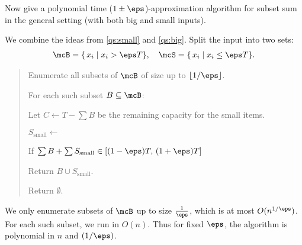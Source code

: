 \documentclass{article}
\begin{document}
\begin{subexercise}
  Now give a polynomial time (\( 1\pm \eps \))-approximation algorithm for subset sum in the general setting (with both big and small inputs).
\end{subexercise}

\begin{solution}
  We combine the ideas from \ref{qs:small} and \ref{qs:big}.
  Split the input into two sets:
  \begin{align*}
    \mcB = \{\,x_i \mid x_i > \eps T\}, \quad \mcS = \{\,x_i \mid x_i \le \eps T\}.
  \end{align*}

  \begin{quote}

  \begin{steps}
    \item Enumerate all subsets of \( \mcB \) of size up to \( \lfloor 1/\eps \rfloor \).
    \item For each such subset \( B \subseteq \mcB \):
    \begin{steps}
      \item Let \( C \leftarrow T - \sum B \) be the remaining capacity for the small items.
      \item \( S_{\text{small}} \leftarrow \) 
      \item If \( \sum B + \sum S_{\text{small}} \in [(1-\eps)T,\,(1+\eps)T] \) \begin{steps}
        \item Return \( B \cup S_{\text{small}} \).
      \end{steps}
    \end{steps}
    \item Return \( \emptyset \).
  \end{steps}
  \end{quote}

  \begin{subproof}[Runtime]
  We only enumerate subsets of \( \mcB \) up to size \( \frac{1}{\eps} \), which is at most \( O(n^{1/\eps}) \).
  For each such subset, we run  in \( O(n) \).
  Thus for fixed \( \eps \), the algorithm is polynomial in \( n \) and \( (1/\eps) \).
  \end{subproof}


\end{solution}
\end{document}
